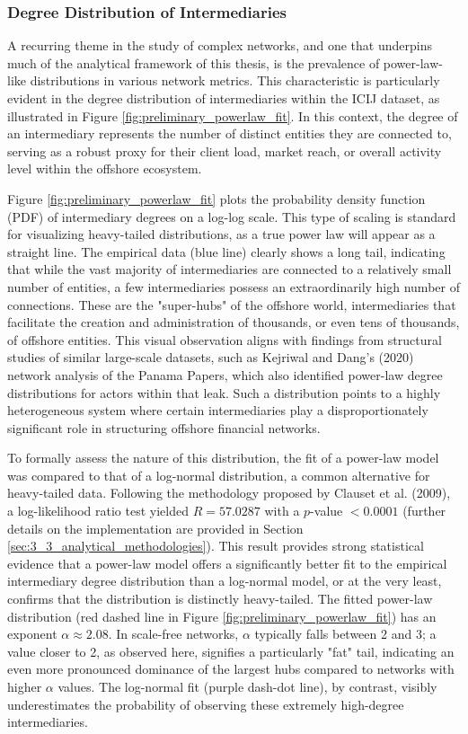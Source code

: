 \subsubsection{Degree Distribution of Intermediaries}
\label{subsubsec:degree_dist_intermediaries}
A recurring theme in the study of complex networks, and one that underpins much of the analytical framework of this thesis, is the prevalence of power-law-like distributions in various network metrics. This characteristic is particularly evident in the degree distribution of intermediaries within the ICIJ dataset, as illustrated in Figure \ref{fig:preliminary_powerlaw_fit}. In this context, the degree of an intermediary represents the number of distinct entities they are connected to, serving as a robust proxy for their client load, market reach, or overall activity level within the offshore ecosystem.

Figure \ref{fig:preliminary_powerlaw_fit} plots the probability density function (PDF) of intermediary degrees on a log-log scale. This type of scaling is standard for visualizing heavy-tailed distributions, as a true power law will appear as a straight line. The empirical data (blue line) clearly shows a long tail, indicating that while the vast majority of intermediaries are connected to a relatively small number of entities, a few intermediaries possess an extraordinarily high number of connections. These are the "super-hubs" of the offshore world, intermediaries that facilitate the creation and administration of thousands, or even tens of thousands, of offshore entities. This visual observation aligns with findings from structural studies of similar large-scale datasets, such as Kejriwal and Dang's (2020) network analysis of the Panama Papers, which also identified power-law degree distributions for actors within that leak. Such a distribution points to a highly heterogeneous system where certain intermediaries play a disproportionately significant role in structuring offshore financial networks.

To formally assess the nature of this distribution, the fit of a power-law model was compared to that of a log-normal distribution, a common alternative for heavy-tailed data. Following the methodology proposed by Clauset et al. (2009), a log-likelihood ratio test yielded $R = 57.0287$ with a $p$-value $< 0.0001$ (further details on the implementation are provided in Section \ref{sec:3_3_analytical_methodologies}). This result provides strong statistical evidence that a power-law model offers a significantly better fit to the empirical intermediary degree distribution than a log-normal model, or at the very least, confirms that the distribution is distinctly heavy-tailed. The fitted power-law distribution (red dashed line in Figure \ref{fig:preliminary_powerlaw_fit}) has an exponent $\alpha \approx 2.08$. In scale-free networks, $\alpha$ typically falls between 2 and 3; a value closer to 2, as observed here, signifies a particularly "fat" tail, indicating an even more pronounced dominance of the largest hubs compared to networks with higher $\alpha$ values. The log-normal fit (purple dash-dot line), by contrast, visibly underestimates the probability of observing these extremely high-degree intermediaries.

